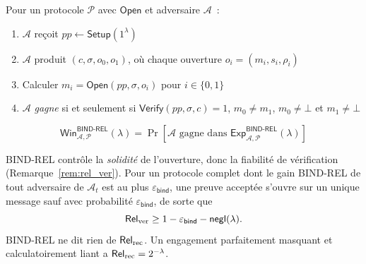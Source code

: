 \begin{sloppypar}
\begin{definition}\label{def:jeu_bind_rel}
Pour un protocole $\mathcal{P}$ avec $\mathsf{Open}$ et adversaire
$\mathcal{A}$~:
\begin{enumerate}
\item $\mathcal{A}$ re\c{c}oit $pp \leftarrow \mathsf{Setup}(1^\lambda)$
\item $\mathcal{A}$ produit $(c, \sigma, o_0, o_1)$, o\`u chaque ouverture
      $o_i = (m_i, s_i, \rho_i)$
\item Calculer $m_i = \mathsf{Open}(pp, \sigma, o_i)$ pour $i \in \{0,1\}$
\item $\mathcal{A}$ \emph{gagne} si et seulement si
  $\mathsf{Verify}(pp,\sigma,c)=1$,
  $m_0 \neq m_1$,
  $m_0 \neq \bot$ et $m_1 \neq \bot$
\end{enumerate}
\begin{equation}
\mathsf{Win}^{\mathsf{BIND\text{-}REL}}_{\mathcal{A},\mathcal{P}}(\lambda)
= \Pr\!\left[\mathcal{A} \text{ gagne dans }
\mathsf{Exp}^{\mathsf{BIND\text{-}REL}}_{\mathcal{A},\mathcal{P}}(\lambda)
\right]
\end{equation}
\end{definition}

\begin{remark}
\label{rem:jeu_bind_rel_link}
BIND-REL contr\^ole la \emph{solidit\'e} de l'ouverture, donc la fiabilit\'e
de v\'erification (Remarque~\ref{rem:rel_ver}). Pour un protocole complet
dont le gain BIND-REL de tout adversaire de $\mathcal{A}_t$ est au plus $\varepsilon_{\mathsf{bind}}$,
une preuve accept\'ee s'ouvre sur un unique message sauf avec probabilit\'e
$\varepsilon_{\mathsf{bind}}$, de sorte que
\begin{equation}
\mathsf{Rel}_{\mathrm{ver}} \geq 1 - \varepsilon_{\mathsf{bind}} - \mathsf{negl}(\lambda).
\end{equation}
BIND-REL ne dit rien de $\mathsf{Rel}_{\mathrm{rec}}$. Un engagement parfaitement masquant et
calculatoirement liant a $\mathsf{Rel}_{\mathrm{rec}} = 2^{-\lambda}$.
\end{remark}


\end{sloppypar}
